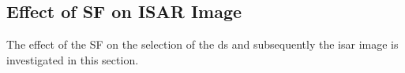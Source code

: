\documentclass[class=report,11pt,crop=false]{standalone}
\begin{document}

    \subsection{Effect of SF on ISAR Image}
    The effect of the SF on the selection of the \gls{ds} and subsequently the \gls{isar} image is investigated in this section.
\end{document}

